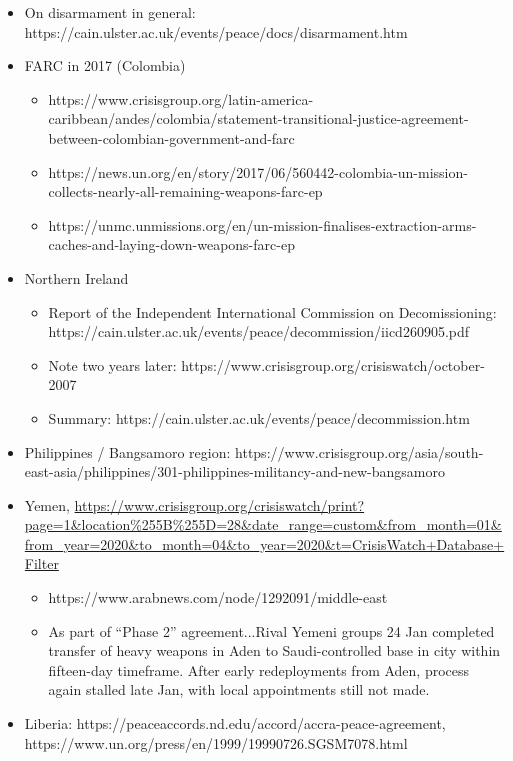 \documentclass[12pt]{article}
\begin{document}
\begin{itemize}
	\item On disarmament in general: https://cain.ulster.ac.uk/events/peace/docs/disarmament.htm
	\item FARC in 2017 (Colombia)
		\begin{itemize}
			\item https://www.crisisgroup.org/latin-america-caribbean/andes/colombia/statement-transitional-justice-agreement-between-colombian-government-and-farc
			\item https://news.un.org/en/story/2017/06/560442-colombia-un-mission-collects-nearly-all-remaining-weapons-farc-ep
			\item https://unmc.unmissions.org/en/un-mission-finalises-extraction-arms-caches-and-laying-down-weapons-farc-ep
		\end{itemize}
	\item Northern Ireland
		\begin{itemize}
			\item Report of the Independent International Commission on Decomissioning: https://cain.ulster.ac.uk/events/peace/decommission/iicd260905.pdf
			\item Note two years later: https://www.crisisgroup.org/crisiswatch/october-2007
			\item Summary: https://cain.ulster.ac.uk/events/peace/decommission.htm
		\end{itemize}
		\item Philippines / Bangsamoro region: https://www.crisisgroup.org/asia/south-east-asia/philippines/301-philippines-militancy-and-new-bangsamoro
	\item Yemen, \url{https://www.crisisgroup.org/crisiswatch/print?page=1&location%255B%255D=28&date_range=custom&from_month=01&from_year=2020&to_month=04&to_year=2020&t=CrisisWatch+Database+Filter}
		\begin{itemize}
			\item https://www.arabnews.com/node/1292091/middle-east
			\item As part of “Phase 2” agreement...Rival Yemeni groups 24 Jan completed transfer of heavy weapons in Aden to Saudi-controlled base in city within fifteen-day timeframe. After early redeployments from Aden, process again stalled late Jan, with local appointments still not made. 
		\end{itemize}
	\item Liberia: https://peaceaccords.nd.edu/accord/accra-peace-agreement, https://www.un.org/press/en/1999/19990726.SGSM7078.html
\end{itemize}
\end{document}
